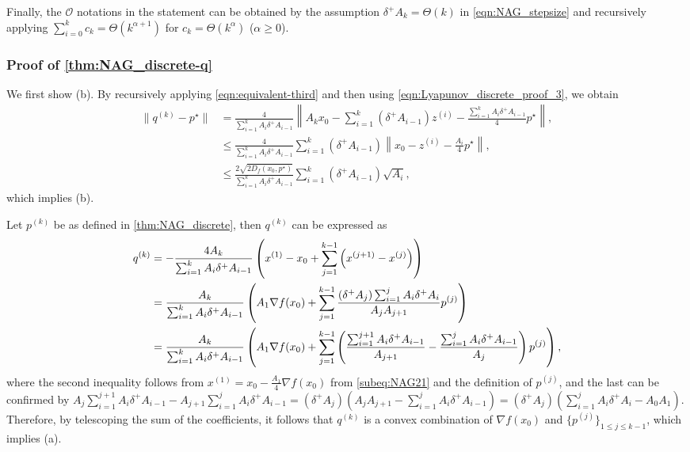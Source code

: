 \documentclass[11pt,a4paper]{article}
\theoremstyle{definition}
\theoremstyle{plain}
\begin{document}
    Finally, the $\mathcal{O}$ notations in the statement can be obtained by the assumption $\delta^+A_k = \Theta(k)$ in \eqref{eqn:NAG_stepsize} and recursively applying $\sum_{i = 0}^kc_k = \Theta(k^{\alpha + 1})$ for $c_k = \Theta(k^\alpha)$ ($\alpha \ge 0$).

\subsubsection{Proof of \texorpdfstring{\cref{thm:NAG_discrete-q}}{Theorem \ref{thm:NAG_discrete-q}}}\label{subsec:proof-q}
    We first show (b).
    By recursively applying \eqref{eqn:equivalent-third} and then using \eqref{eqn:Lyapunov_discrete_proof_3}, we obtain
    \begin{align*}
        \|q^{(k)} - p^\star\|
        &= \frac{4}{\sum_{i = 1}^kA_i\delta^+A_{i - 1}}\left\|A_kx_0 - \sum_{i = 1}^{k}(\delta^+A_{i - 1})z^{(i)} - \frac{\sum_{i = 1}^kA_i\delta^+A_{i - 1}}4p^\star\right\|,\\
        &\le \frac{4}{\sum_{i = 1}^kA_i\delta^+A_{i - 1}}\sum_{i = 1}^k(\delta^+A_{i - 1})\left\|x_0 - z^{(i)} - \frac{A_i}4p^\star\right\|,\\
        &\le \frac{2\sqrt{2D_f(x_0, p^\star)}}{\sum_{i = 1}^kA_i\delta^+A_{i - 1}}\sum_{i = 1}^k(\delta^+A_{i - 1})\sqrt{A_i},
    \end{align*}
    which implies (b).

    Let $p^{(k)}$ be as defined in \cref{thm:NAG_discrete}, then $q^{(k)}$ can be expressed as
    \begin{align}
        q^{(k)}
        &= -\frac{4A_k}{\sum_{i = 1}^kA_i\delta^+A_{i - 1}}\left(x^{(1)} - x_0 + \sum_{j = 1}^{k - 1}\left(x^{(j + 1)} - x^{(j)}\right)\right)\notag\\
        &= \frac{A_k}{\sum_{i = 1}^kA_i\delta^+A_{i - 1}}\left(A_1\nabla f(x_0) + \sum_{j = 1}^{k - 1}\frac{(\delta^+A_j)\sum_{i = 1}^jA_i\delta^+A_i}{A_jA_{j + 1}}p^{(j)}\right)\notag\\
        &= \frac{A_k}{\sum_{i = 1}^kA_i\delta^+A_{i - 1}}\left(A_1\nabla f(x_0) + \sum_{j = 1}^{k - 1}\left(\frac{\sum_{i = 1}^{j + 1}A_i\delta^+A_{i - 1}}{A_{j + 1}} - \frac{\sum_{i = 1}^jA_i\delta^+A_{i - 1}}{A_j}\right)p^{(j)}\right)\label{eqn:proof-q},
    \end{align}
    where the second inequality follows from $x^{(1)} = x_0 - \frac{A_1}4\nabla f(x_0)$ from \eqref{subeq:NAG21} and the definition of $p^{(j)}$, and the last can be confirmed by $A_j\sum_{i = 1}^{j + 1}A_i\delta^+A_{i - 1} - A_{j + 1}\sum_{i = 1}^jA_i\delta^+A_{i - 1} = (\delta^+A_j)(A_jA_{j + 1} - \sum_{i = 1}^jA_i\delta^+A_{i - 1}) = (\delta^+A_j)(\sum_{i = 1}^jA_i\delta^+A_i - A_0A_1)$.
    Therefore, by telescoping the sum of the coefficients, it follows that $q^{(k)}$ is a convex combination of $\nabla f(x_0)$ and $\{p^{(j)}\}_{1 \le j \le k - 1}$, which implies (a).
\end{document}
